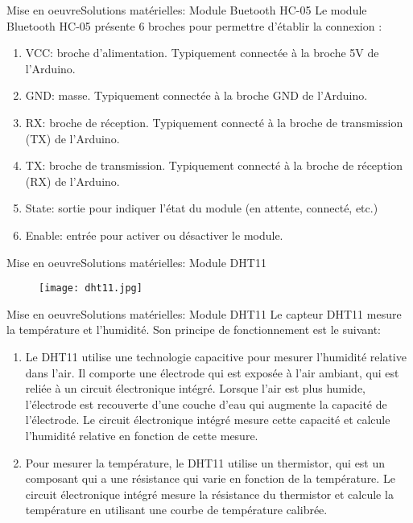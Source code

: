 \documentclass{beamer}
\begin{document}
	\begin{frame}{Mise en oeuvre}{Solutions matérielles: Module Buetooth HC-05}
		Le module Bluetooth HC-05 présente 6 broches pour permettre d'établir la connexion :
		\begin{enumerate}
			\item VCC: broche d'alimentation. Typiquement connectée à la broche 5V de l'Arduino.
			\item GND: masse. Typiquement connectée à la broche GND de l'Arduino.
			\item RX: broche de réception. Typiquement connecté à la broche de transmission (TX) de l'Arduino.
			\item TX: broche de transmission. Typiquement connecté à la broche de réception (RX) de l'Arduino.
			\item State: sortie pour indiquer l'état du module (en attente, connecté, etc.)
			\item Enable: entrée pour activer ou désactiver le module.
		\end{enumerate}
	\end{frame}
	
	\begin{frame}{Mise en oeuvre}{Solutions matérielles: Module DHT11}
		\begin{figure}\centering
			\texttt{[image: dht11.jpg]}
		\end{figure}
		
	\end{frame}
	
	\begin{frame}{Mise en oeuvre}{Solutions matérielles: Module DHT11}
		Le capteur DHT11 mesure la température et l'humidité. Son principe de fonctionnement est le suivant:
		\begin{enumerate}
			\item Le DHT11 utilise une technologie capacitive pour mesurer l'humidité relative dans l'air. Il comporte une électrode qui est exposée à l'air ambiant, qui est reliée à un circuit électronique intégré. Lorsque l'air est plus humide, l'électrode est recouverte d'une couche d'eau qui augmente la capacité de l'électrode. Le circuit électronique intégré mesure cette capacité et calcule l'humidité relative en fonction de cette mesure.
			\item Pour mesurer la température, le DHT11 utilise un thermistor, qui est un composant qui a une résistance qui varie en fonction de la température. Le circuit électronique intégré mesure la résistance du thermistor et calcule la température en utilisant une courbe de température calibrée.
		\end{enumerate}	
	\end{frame}
	
\end{document}
